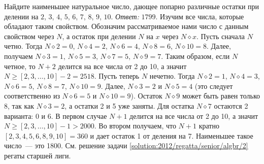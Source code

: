 \problem
Найдите наименьшее натуральное число, дающее попарно различные остатки при
делении на $2$, $3$, $4$, $5$, $6$, $7$, $8$, $9$, $10$.
\solution
\label{solution:2012/pers-algbr/junior/1}%
\emph{Ответ:} $1799$.
%
\begingroup\let\div\diamond
Изучим все числа, которые обладают таким свойством.
Обозначим рассматриваемое нами число с данным свойством через $N$, а остаток
при делении $N$ на $x$ через $N \div x$.
Пусть сначала $N$ четно.
Тогда $N \div 2 = 0$, $N \div 4 = 2$, $N \div 6 = 4$, $N \div 8 = 6$,
$N \div 10 = 8$.
Далее, получаем $N \div 3 = 1$, $N \div 5 = 3$, $N \div 7 = 5$, $N \div 9 = 7$.
Таким образом, если $N$ четное, то $N + 2$ делится на все числа от 2 до 10,
а значит $N \geq [2, 3, \ldots, 10] - 2 = 2518$.
Пусть теперь $N$ нечетно.
Тогда $N \div 2 = 1$, $N \div 4 = 3$, $N \div 6 = 5$, $N \div 8 = 7$,
$N \div 10 = 9$.
Далее, $N \div 3 = 2$ и $N \div 5 = 4$
(это следует соответственно из $N \div 6 = 5$ и $N \div 10 = 9$).
Остаток $N \div 9$ может быть равен только 8, так как $N \div 3 = 2$, а остатки
2 и 5 уже заняты.
Для остатка $N \div 7$ остаются 2 варианта: 0 и 6.
В первом случае $N + 1$ делится на все числа от 2 до 10, а значит
$N \geq [2, 3, \ldots, 10] - 1 > 2000$.
Во втором получаем, что $N + 1$ кратно $[2, 3, 4, 5, 6, 8, 9, 10] = 360$ и дает
остаток 1 от деления на 7.
Наименьшее такое число~--- это 1800.
\endgroup
\else%
См. решение задачи \ref{solution:2012/regatta/senior/algbr/2} регаты старшей
лиги.
\fi
\endproblem
